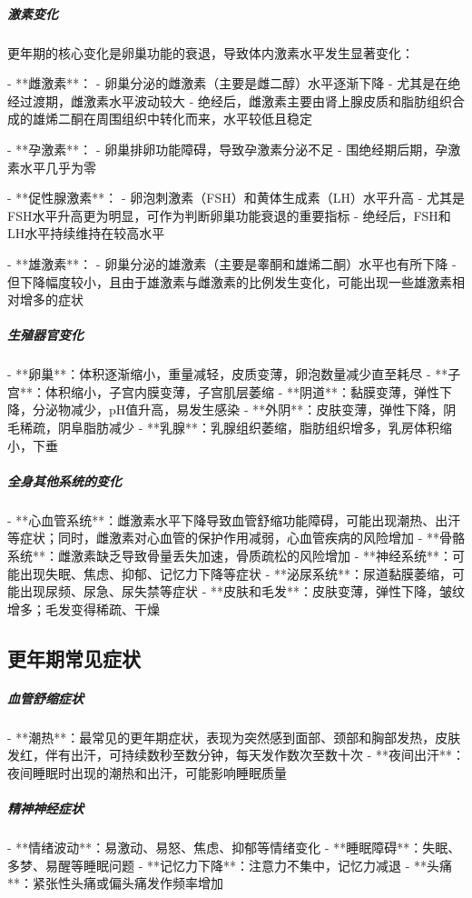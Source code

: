 \begin{enumerate}
\subparagraph{激素变化}
更年期的核心变化是卵巢功能的衰退，导致体内激素水平发生显著变化：

- **雌激素**：
  - 卵巢分泌的雌激素（主要是雌二醇）水平逐渐下降
  - 尤其是在绝经过渡期，雌激素水平波动较大
  - 绝经后，雌激素主要由肾上腺皮质和脂肪组织合成的雄烯二酮在周围组织中转化而来，水平较低且稳定

- **孕激素**：
  - 卵巢排卵功能障碍，导致孕激素分泌不足
  - 围绝经期后期，孕激素水平几乎为零

- **促性腺激素**：
  - 卵泡刺激素（FSH）和黄体生成素（LH）水平升高
  - 尤其是FSH水平升高更为明显，可作为判断卵巢功能衰退的重要指标
  - 绝经后，FSH和LH水平持续维持在较高水平

- **雄激素**：
  - 卵巢分泌的雄激素（主要是睾酮和雄烯二酮）水平也有所下降
  - 但下降幅度较小，且由于雄激素与雌激素的比例发生变化，可能出现一些雄激素相对增多的症状

\subparagraph{生殖器官变化}

- **卵巢**：体积逐渐缩小，重量减轻，皮质变薄，卵泡数量减少直至耗尽
- **子宫**：体积缩小，子宫内膜变薄，子宫肌层萎缩
- **阴道**：黏膜变薄，弹性下降，分泌物减少，pH值升高，易发生感染
- **外阴**：皮肤变薄，弹性下降，阴毛稀疏，阴阜脂肪减少
- **乳腺**：乳腺组织萎缩，脂肪组织增多，乳房体积缩小，下垂

\subparagraph{全身其他系统的变化}

- **心血管系统**：雌激素水平下降导致血管舒缩功能障碍，可能出现潮热、出汗等症状；同时，雌激素对心血管的保护作用减弱，心血管疾病的风险增加
- **骨骼系统**：雌激素缺乏导致骨量丢失加速，骨质疏松的风险增加
- **神经系统**：可能出现失眠、焦虑、抑郁、记忆力下降等症状
- **泌尿系统**：尿道黏膜萎缩，可能出现尿频、尿急、尿失禁等症状
- **皮肤和毛发**：皮肤变薄，弹性下降，皱纹增多；毛发变得稀疏、干燥

\subsection{更年期常见症状}

\subparagraph{血管舒缩症状}

- **潮热**：最常见的更年期症状，表现为突然感到面部、颈部和胸部发热，皮肤发红，伴有出汗，可持续数秒至数分钟，每天发作数次至数十次
- **夜间出汗**：夜间睡眠时出现的潮热和出汗，可能影响睡眠质量

\subparagraph{精神神经症状}

- **情绪波动**：易激动、易怒、焦虑、抑郁等情绪变化
- **睡眠障碍**：失眠、多梦、易醒等睡眠问题
- **记忆力下降**：注意力不集中，记忆力减退
- **头痛**：紧张性头痛或偏头痛发作频率增加


\end{enumerate}
